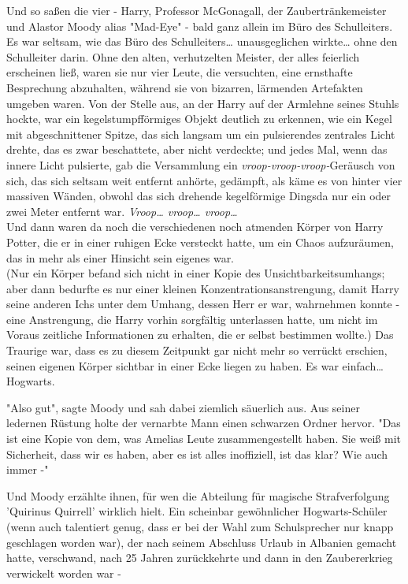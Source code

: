 {Und so saßen die vier - Harry, Professor McGonagall, der Zaubertränkemeister und Alastor Moody alias "Mad-Eye" - bald ganz allein im Büro des Schulleiters. Es war seltsam, wie das Büro des Schulleiters… unausgeglichen wirkte… ohne den Schulleiter darin. Ohne den alten, verhutzelten Meister, der alles feierlich erscheinen ließ, waren sie nur vier Leute, die versuchten, eine ernsthafte Besprechung abzuhalten, während sie von bizarren, lärmenden Artefakten umgeben waren. Von der Stelle aus, an der Harry auf der Armlehne seines Stuhls hockte, war ein kegelstumpfförmiges Objekt deutlich zu erkennen, wie ein Kegel mit abgeschnittener Spitze, das sich langsam um ein pulsierendes zentrales Licht drehte, das es zwar beschattete, aber nicht verdeckte; und jedes Mal, wenn das innere Licht pulsierte, gab die Versammlung ein \emph{vroop-vroop-vroop-}Geräusch von sich, das sich seltsam weit entfernt anhörte, gedämpft, als käme es von hinter vier massiven Wänden, obwohl das sich drehende kegelförmige Dingsda nur ein oder zwei Meter entfernt war. \emph{Vroop… vroop… vroop…}\\ Und dann waren da noch die verschiedenen noch atmenden Körper von Harry Potter, die er in einer ruhigen Ecke versteckt hatte, um ein Chaos aufzuräumen, das in mehr als einer Hinsicht sein eigenes war.\\ (Nur ein Körper befand sich nicht in einer Kopie des Unsichtbarkeitsumhangs; aber dann bedurfte es nur einer kleinen Konzentrationsanstrengung, damit Harry seine anderen Ichs unter dem Umhang, dessen Herr er war, wahrnehmen konnte - eine Anstrengung, die Harry vorhin sorgfältig unterlassen hatte, um nicht im Voraus zeitliche Informationen zu erhalten, die er selbst bestimmen wollte.) Das Traurige war, dass es zu diesem Zeitpunkt gar nicht mehr so verrückt erschien, seinen eigenen Körper sichtbar in einer Ecke liegen zu haben. Es war einfach… Hogwarts.

"Also gut", sagte Moody und sah dabei ziemlich säuerlich aus. Aus seiner ledernen Rüstung holte der vernarbte Mann einen schwarzen Ordner hervor. "Das ist eine Kopie von dem, was Amelias Leute zusammengestellt haben. Sie weiß mit Sicherheit, dass wir es haben, aber es ist alles inoffiziell, ist das klar? Wie auch immer -"

Und Moody erzählte ihnen, für wen die Abteilung für magische Strafverfolgung 'Quirinus Quirrell' wirklich hielt. Ein scheinbar gewöhnlicher Hogwarts-Schüler (wenn auch talentiert genug, dass er bei der Wahl zum Schulsprecher nur knapp geschlagen worden war), der nach seinem Abschluss Urlaub in Albanien gemacht hatte, verschwand, nach 25 Jahren zurückkehrte und dann in den Zaubererkrieg verwickelt worden war -

}
